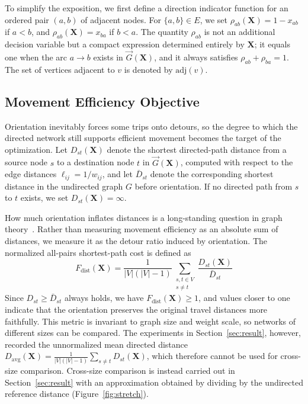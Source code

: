 \documentclass[twocolumn,a4paper]{article}
\begin{document}
To simplify the exposition, we first define a direction indicator function for an ordered pair \((a,b)\) of adjacent nodes. For \(\{a,b\}\in E\), we set \(\rho_{ab}(\mathbf{X})=1-x_{ab}\) if \(a<b\), and \(\rho_{ab}(\mathbf{X})=x_{ba}\) if \(b<a\). The quantity \(\rho_{ab}\) is not an additional decision variable but a compact expression determined entirely by \(\mathbf{X}\); it equals one when the arc \(a\rightarrow b\) exists in \(\vec{G}(\mathbf{X})\), and it always satisfies \(\rho_{ab}+\rho_{ba}=1\). The set of vertices adjacent to \(v\) is denoted by \(\mathrm{adj}(v)\).

\subsection{Movement Efficiency Objective}

Orientation inevitably forces some trips onto detours, so the degree to which the directed network still supports efficient movement becomes the target of the optimization. Let \(D_{st}(\mathbf{X})\) denote the shortest directed-path distance from a source node \(s\) to a destination node \(t\) in \(\vec{G}(\mathbf{X})\), computed with respect to the edge distances \(\ell_{ij}=1/w_{ij}\), and let \(\bar{D}_{st}\) denote the corresponding shortest distance in the undirected graph \(G\) before orientation. If no directed path from \(s\) to \(t\) exists, we set \(D_{st}(\mathbf{X})=\infty\).

How much orientation inflates distances is a long-standing question in graph theory~\cite{chvatal1978distances}. Rather than measuring movement efficiency as an absolute sum of distances, we measure it as the detour ratio induced by orientation. The normalized all-pairs shortest-path cost is defined as
\begin{equation}
F_{\mathrm{dist}}(\mathbf{X})=\frac{1}{|V|(|V|-1)}\sum_{\substack{s,t\in V\\s\neq t}}\frac{D_{st}(\mathbf{X})}{\bar{D}_{st}}
\label{eq:stretch}
\end{equation}
Since \(D_{st}\geq\bar{D}_{st}\) always holds, we have \(F_{\mathrm{dist}}(\mathbf{X})\geq1\), and values closer to one indicate that the orientation preserves the original travel distances more faithfully. This metric is invariant to graph size and weight scale, so networks of different sizes can be compared. The experiments in Section~\ref{sec:result}, however, recorded the unnormalized mean directed distance \(D_{\mathrm{avg}}(\mathbf{X})=\frac{1}{|V|(|V|-1)}\sum_{s\neq t}D_{st}(\mathbf{X})\), which therefore cannot be used for cross-size comparison. Cross-size comparison is instead carried out in Section~\ref{sec:result} with an approximation obtained by dividing by the undirected reference distance (Figure~\ref{fig:stretch}).
\end{document}
